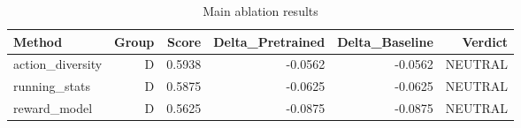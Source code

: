 \begin{table}[htbp]
\centering
\caption{Main ablation results}
\label{tab:main-results}
\begin{tabular}{lrrrrr}
\toprule
\textbf{Method} & \textbf{Group} & \textbf{Score} & \textbf{Delta\_Pretrained} & \textbf{Delta\_Baseline} & \textbf{Verdict} \\
\midrule
action\_diversity & D & 0.5938 & -0.0562 & -0.0562 & NEUTRAL \\
running\_stats & D & 0.5875 & -0.0625 & -0.0625 & NEUTRAL \\
reward\_model & D & 0.5625 & -0.0875 & -0.0875 & NEUTRAL \\
\bottomrule
\end{tabular}
\end{table}